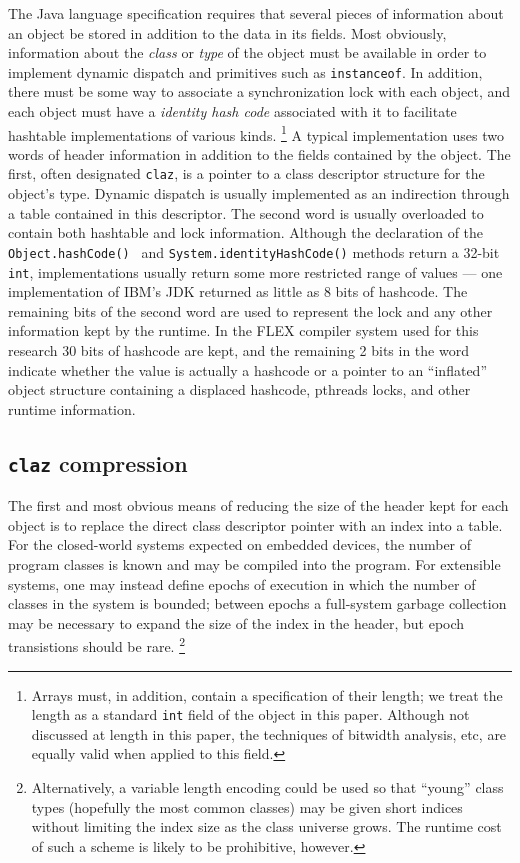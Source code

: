 \documentclass[preprint]{acmconf}
\begin{document}
The Java language specification requires that several pieces of
information about an object be stored in addition to the data in its
fields.  Most obviously, information about the {\it class} or {\it
  type} of the object must be available in order to implement dynamic
dispatch and primitives such as {\tt instanceof}.  In addition, there
must be some way to associate a synchronization lock with each object,
and each object must have a {\it identity hash code} associated with
it to facilitate hashtable implementations of various kinds.%
\footnote{Arrays must, in addition, contain a specification of their
  length; we treat the length as a standard {\tt int} field of the
  object in this paper.  Although not discussed at length in this
  paper, the techniques of bitwidth analysis, etc, are equally valid
  when applied to this field.}
A typical implementation uses two words of header information in
addition to the fields contained by the object.  The first, often
designated {\tt claz}, is a pointer to a class descriptor structure for the
object's type.  Dynamic dispatch is usually implemented as an
indirection through a table contained in this descriptor.
The second word is usually overloaded to contain both hashtable and
lock information.  Although the declaration of the {\tt
  Object.hashCode() } and {\tt System.identityHashCode()} methods
return a 32-bit {\tt int}, implementations usually return some
more restricted range of values --- one implementation of IBM's JDK
\cite{bacon98}
returned as little as 8 bits of hashcode.  The remaining bits of the
second word are used to represent the lock and any other information
kept by the runtime.  In the FLEX compiler system used for this
research 30 bits of hashcode are kept, and the
remaining 2 bits in the word indicate whether the value is actually a
hashcode or
a pointer to an ``inflated'' object structure containing
a displaced hashcode, pthreads locks,
and other runtime information.

\subsection{{\tt claz} compression}
The first and most obvious means of reducing the size of the header
kept for each object is to replace the direct class descriptor
pointer with an index into a table.  For the closed-world systems
expected on embedded devices, the number of program classes is known
and may be compiled into the program.  For extensible systems, one may
instead define epochs of execution in which the number of classes
in the system is bounded; between epochs a full-system garbage
collection may be necessary to expand the size of the index in the
header, but epoch transistions should be rare.%
\footnote{Alternatively, a
variable length encoding could be used so that ``young'' class types
(hopefully the most common classes) may be given short indices without
limiting the index size as the class universe grows.  The runtime cost
of such a scheme is likely to be prohibitive, however.}
\end{document}
